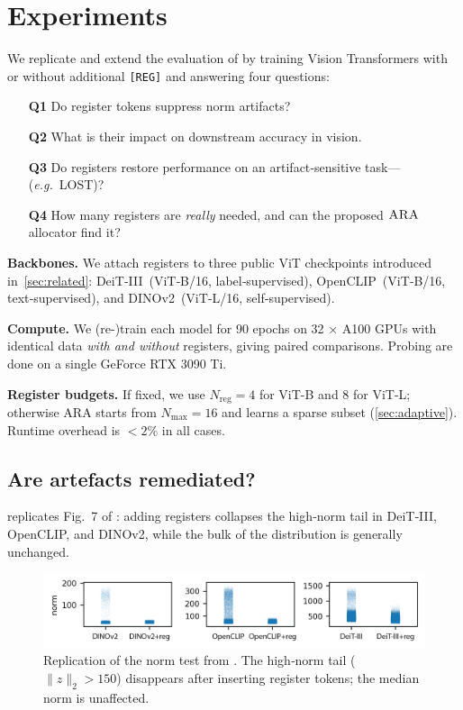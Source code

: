 \documentclass{article}
\newcommand{\RegTok}{\texttt{[REG]}\xspace}
\newcommand{\citet}{\textcite}
\newcommand{\OURS}{\textsc{ARA}\xspace}
\begin{document}
\section{Experiments}
\label{sec:exp}
We replicate and extend the evaluation of \citet{darcetVisionTransformersNeed2024}
by training Vision Transformers with or without additional \RegTok and answering four questions:

\begin{enumerate}
  \item[\textbf{Q1}] Do register tokens suppress norm artifacts?
  \item[\textbf{Q2}] What is their impact on downstream accuracy in vision. %
  \item[\textbf{Q3}] Do registers restore performance on an artifact‑sensitive task—(\emph{e.g.}\ LOST)?
  \item[\textbf{Q4}] How many registers are \emph{really} needed, and can the proposed $\OURS$ allocator find it?
\end{enumerate}

\textbf{Backbones.}
We attach registers to three public ViT checkpoints introduced in \cref{sec:related}:  
DeiT‑III (ViT‑B/16, label‑supervised),  
OpenCLIP (ViT‑B/16, text‑supervised), and  
DINOv2 (ViT‑L/16, self‑supervised).

\textbf{Compute.}
We (re-)train each model for 90 epochs on 32 × A100 GPUs with identical data \emph{with and without} registers, giving paired comparisons.
Probing are done on a single GeForce RTX 3090 Ti.

\textbf{Register budgets.} 
If fixed, we use $N_{\text{reg}}\!=\!4$ for ViT-B and 8 for ViT-L;
otherwise \OURS starts from $N_{\max}\!=\!16$ and learns a sparse subset (\cref{sec:adaptive}).
Runtime overhead is $<\!2\%$ in all cases.



\subsection{Are artefacts remediated?}
 replicates Fig.~7 of \citet{darcetVisionTransformersNeed2024}:
adding registers collapses the high‑norm tail in DeiT‑III, OpenCLIP, and DINOv2, while the bulk of the distribution is generally unchanged.

\begin{figure}[t]
\centering
\includegraphics[width=\textwidth]{resources/fig_norm_distrib_before_after_stripplot-2.png}
\vspace{-1.2em}
\caption{%
Replication of the norm test from \citet{darcetVisionTransformersNeed2024}.
The high‑norm tail ($\|z\|_2\!>\!150$) disappears after inserting register tokens; the median norm is unaffected.
}
\label{fig:norm_distrib_before_after}
\end{figure}
\end{document}
